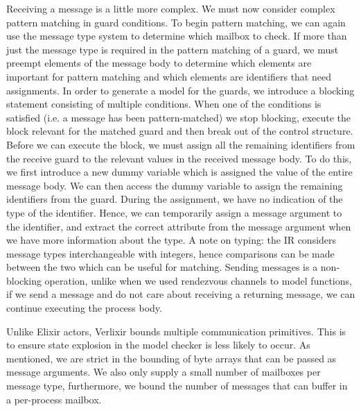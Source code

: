 \par
Receiving a message is a little more complex. We must now consider complex pattern matching in guard conditions. To begin pattern matching, we can again use the message type system to determine which mailbox to check. If more than just the message type is required in the pattern matching of a guard, we must preempt elements of the message body to determine which elements are important for pattern matching and which elements are identifiers that need assignments. In order to generate a model for the guards, we introduce a blocking statement consisting of multiple conditions. When one of the conditions is satisfied (i.e. a message has been pattern-matched) we stop blocking, execute the block relevant for the matched guard and then break out of the control structure. Before we can execute the block, we must assign all the remaining identifiers from the receive guard to the relevant values in the received message body. To do this, we first introduce a new dummy variable which is assigned the value of the entire message body. We can then access the dummy variable to assign the remaining identifiers from the guard. During the assignment, we have no indication of the type of the identifier. Hence, we can temporarily assign a message argument to the identifier, and extract the correct attribute from the message argument when we have more information about the type. A note on typing: the IR considers message types interchangeable with integers, hence comparisons can be made between the two which can be useful for matching. Sending messages is a non-blocking operation, unlike when we used rendezvous channels to model functions, if we send a message and do not care about receiving a returning message, we can continue executing the process body.
\par
Unlike Elixir actors, Verlixir bounds multiple communication primitives. This is to ensure state explosion in the model checker is less likely to occur. As mentioned, we are strict in the bounding of byte arrays that can be passed as message arguments. We also only supply a small number of mailboxes per message type, furthermore, we bound the number of messages that can buffer in a per-process mailbox.
